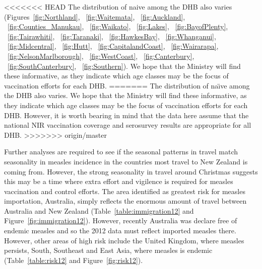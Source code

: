 \documentclass{article}
\begin{document}
\begin{itemize}
<<<<<<< HEAD
The distribution of naive among the DHB also varies (Figures~\ref{fig:Northland}, ~\ref{fig:Waitemata}, ~\ref{fig:Auckland}, ~\ref{fig:Counties_Manukau}, ~\ref{fig:Waikato}, ~\ref{fig:Lakes}, ~\ref{fig:BayofPlenty}, ~\ref{fig:Tairawhiti}, ~\ref{fig:Taranaki}, ~\ref{fig:HawkesBay}, ~\ref{fig:Whanganui}, ~\ref{fig:Midcentral}, ~\ref{fig:Hutt}, ~\ref{fig:CapitalandCoast}, ~\ref{fig:Wairarapa}, ~\ref{fig:NelsonMarlborough}, ~\ref{fig:WestCoast}, ~\ref{fig:Canterbury}, ~\ref{fig:SouthCanterbury}, ~\ref{fig:Southern}). We hope that the Ministry will find these informative, as they indicate which age classes may be the focus of vaccination efforts for each DHB.
=======
The distribution of na\"{\i}ve among the DHB also varies. We hope that the Ministry will find these informative, as they indicate which age classes may be the focus of vaccination efforts for each DHB. However, it is worth bearing in mind that the data here assume that the national NIR vaccination coverage and serosurvey results are appropriate for all DHB.
>>>>>>> origin/master

Further analyses are required to see if the seasonal patterns in travel match seasonality in measles incidence in the countries most travel to New Zealand is coming from. However, the strong seasonality in travel around Christmas suggests this may be a time where extra effort and vigilence is required for measles vaccination and control efforts. The area identified as greatest risk for measles importation, Australia, simply reflects the enormous amount of travel between Australia and New Zealand (Table~\ref{table:immigration12} and Figure~\ref{fig:immigration12}). However, recently Australia was declare free of endemic measles and so the 2012 data must reflect imported measles there. However, other areas of high risk include the United Kingdom, where measles persists, South, Southeast and East Asia, where measles is endemic (Table~\ref{table:risk12} and Figure~\ref{fig:risk12}).


\end{itemize}
\end{document}
